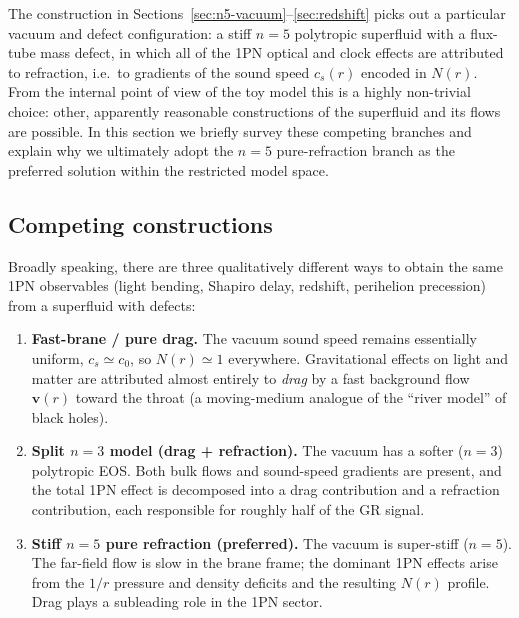 \documentclass[11pt]{article}
\begin{document}
The construction in Sections~\ref{sec:n5-vacuum}--\ref{sec:redshift} picks
out a particular vacuum and defect configuration: a stiff $n=5$ polytropic
superfluid with a flux-tube mass defect, in which all of the 1PN optical
and clock effects are attributed to refraction, i.e.\ to gradients of the
sound speed $c_s(r)$ encoded in $N(r)$.
From the internal point of view of the toy model this is a highly
non-trivial choice: other, apparently reasonable constructions of the
superfluid and its flows are possible.
In this section we briefly survey these competing branches and explain why
we ultimately adopt the $n=5$ pure-refraction branch as the preferred
solution within the restricted model space.


\subsection{Competing constructions}
\label{subsec:degeneracies-menu}

Broadly speaking, there are three qualitatively different ways to obtain
the same 1PN observables (light bending, Shapiro delay, redshift,
perihelion precession) from a superfluid with defects:

\begin{enumerate}
  \item[(A)] \textbf{Fast-brane / pure drag.}
    The vacuum sound speed remains essentially uniform, $c_s \simeq c_0$,
    so $N(r) \simeq 1$ everywhere.
    Gravitational effects on light and matter are attributed almost
    entirely to \emph{drag} by a fast background flow $\mathbf{v}(r)$
    toward the throat (a moving-medium analogue of the ``river model''
    of black holes).

  \item[(B)] \textbf{Split $n=3$ model (drag + refraction).}
    The vacuum has a softer ($n=3$) polytropic EOS.
    Both bulk flows and sound-speed gradients are present, and the total
    1PN effect is decomposed into a drag contribution and a refraction
    contribution, each responsible for roughly half of the GR signal.

  \item[(C)] \textbf{Stiff $n=5$ pure refraction (preferred).}
    The vacuum is super-stiff ($n=5$).
    The far-field flow is slow in the brane frame; the dominant 1PN
    effects arise from the $1/r$ pressure and density deficits and the
    resulting $N(r)$ profile.
    Drag plays a subleading role in the 1PN sector.
\end{enumerate}
\end{document}
